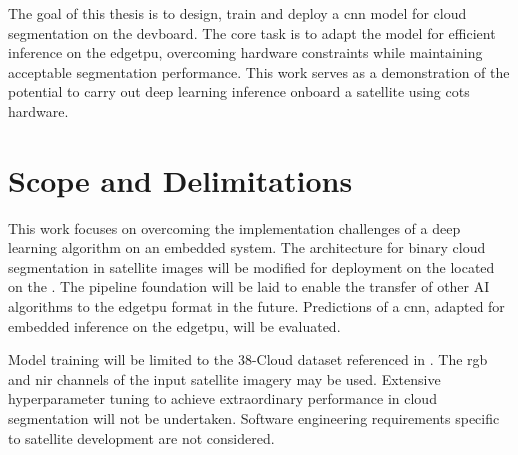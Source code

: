 {The goal of this thesis is to design, train and deploy a \gls{cnn} model for cloud segmentation on the \gls{devboard}.
The core task is to adapt the model for efficient inference on the \gls{edgetpu},
overcoming hardware constraints while maintaining acceptable segmentation performance.
This work serves as a demonstration of the potential to carry out deep learning inference onboard a satellite using \gls{cots} hardware.

\section{Scope and Delimitations}

This work focuses on overcoming the implementation challenges of a deep learning algorithm on an embedded system.
The  \cite{CloudNet2019} architecture for binary cloud segmentation in satellite images will be modified
for deployment on the  located on the .
The pipeline foundation will be laid to enable the transfer of other AI algorithms to the \gls{edgetpu} format in the future.
Predictions of a \gls{cnn}, adapted for embedded inference on the \gls{edgetpu}, will be evaluated.

Model training will be limited to the 38-Cloud dataset referenced in \cite{CloudNet2019}.
The \gls{rgb} and \gls{nir} channels of the input satellite imagery may be used.
Extensive hyperparameter tuning to achieve extraordinary performance in cloud segmentation will not be undertaken.
Software engineering requirements specific to satellite development are not considered.

}